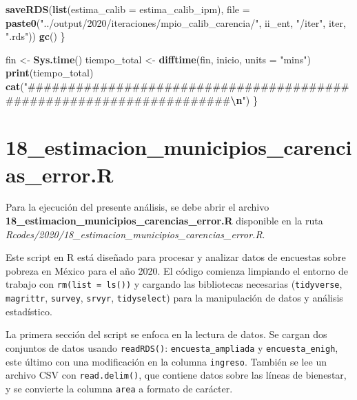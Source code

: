 \documentclass[
  12pt,
]{book}
\newenvironment{Shaded}{\begin{snugshade}}{\end{snugshade}}
\newcommand{\AttributeTok}[1]{\textcolor[rgb]{0.13,0.29,0.53}{#1}}
\newcommand{\FunctionTok}[1]{\textcolor[rgb]{0.13,0.29,0.53}{\textbf{#1}}}
\newcommand{\NormalTok}[1]{#1}
\newcommand{\OtherTok}[1]{\textcolor[rgb]{0.56,0.35,0.01}{#1}}
\newcommand{\SpecialCharTok}[1]{\textcolor[rgb]{0.81,0.36,0.00}{\textbf{#1}}}
\newcommand{\StringTok}[1]{\textcolor[rgb]{0.31,0.60,0.02}{#1}}
\begin{document}
\begin{Shaded}
\begin{Highlighting}[]
    \FunctionTok{saveRDS}\NormalTok{(}\FunctionTok{list}\NormalTok{(}\AttributeTok{estima\_calib =}\NormalTok{ estima\_calib\_ipm),}
            \AttributeTok{file =} \FunctionTok{paste0}\NormalTok{(}\StringTok{"../output/2020/iteraciones/mpio\_calib\_carencia/"}\NormalTok{,}
\NormalTok{                           ii\_ent, }\StringTok{"/iter"}\NormalTok{, iter, }\StringTok{".rds"}\NormalTok{))}
    \FunctionTok{gc}\NormalTok{()}
\NormalTok{  \}}
  
\NormalTok{  fin }\OtherTok{\textless{}{-}} \FunctionTok{Sys.time}\NormalTok{()}
\NormalTok{  tiempo\_total }\OtherTok{\textless{}{-}} \FunctionTok{difftime}\NormalTok{(fin, inicio, }\AttributeTok{units =} \StringTok{"mins"}\NormalTok{)}
  \FunctionTok{print}\NormalTok{(tiempo\_total)}
  \FunctionTok{cat}\NormalTok{(}\StringTok{"\#\#\#\#\#\#\#\#\#\#\#\#\#\#\#\#\#\#\#\#\#\#\#\#\#\#\#\#\#\#\#\#\#\#\#\#\#\#\#\#\#\#\#\#\#\#\#\#\#\#\#\#\#\#\#\#\#\#\#\#\#\#\#\#\#\#\#\#}\SpecialCharTok{\textbackslash{}n}\StringTok{"}\NormalTok{)}
\NormalTok{\}}
\end{Highlighting}
\end{Shaded}

\hypertarget{estimacion_municipios_carencias_error.r}{%
\chapter*{18\_estimacion\_municipios\_carencias\_error.R}\label{estimacion_municipios_carencias_error.r}}

Para la ejecución del presente análisis, se debe abrir el archivo \textbf{18\_estimacion\_municipios\_carencias\_error.R} disponible en la ruta \emph{Rcodes/2020/18\_estimacion\_municipios\_carencias\_error.R}.

Este script en R está diseñado para procesar y analizar datos de encuestas sobre pobreza en México para el año 2020. El código comienza limpiando el entorno de trabajo con \texttt{rm(list\ =\ ls())} y cargando las bibliotecas necesarias (\texttt{tidyverse}, \texttt{magrittr}, \texttt{survey}, \texttt{srvyr}, \texttt{tidyselect}) para la manipulación de datos y análisis estadístico.

La primera sección del script se enfoca en la lectura de datos. Se cargan dos conjuntos de datos usando \texttt{readRDS()}: \texttt{encuesta\_ampliada} y \texttt{encuesta\_enigh}, este último con una modificación en la columna \texttt{ingreso}. También se lee un archivo CSV con \texttt{read.delim()}, que contiene datos sobre las líneas de bienestar, y se convierte la columna \texttt{area} a formato de carácter.
\end{document}
